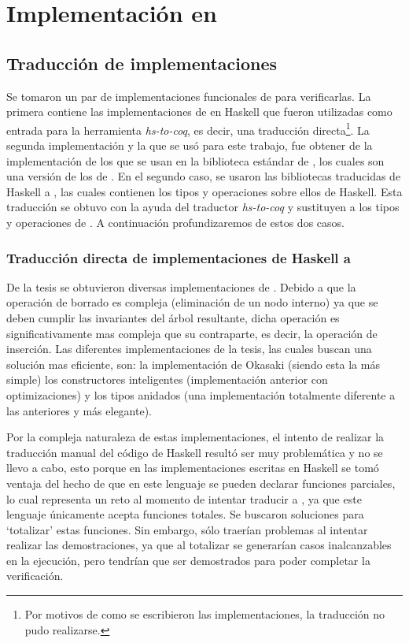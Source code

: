 \chapter{Implementación en {\coq}}

\section{Traducción de implementaciones}
Se tomaron un par de implementaciones funcionales de {\arns} para verificarlas. La primera contiene 
las implementaciones de \cite{tesisG} en Haskell que fueron utilizadas como entrada para la 
herramienta \textit{hs-to-coq}, es decir, una traducci\'on directa\footnote{Por motivos de como se  escribieron las implementaciones, la traducción no pudo realizarse.}. La segunda implementaci\'on y la 
que se us\'o para este trabajo, fue obtener de \cite{MSetRBT} la implementaci\'on de los {\arns} que 
se usan en la biblioteca estándar de {\coq}, los cuales son una versi\'on de los {\arns} de 
\cite{Okasaki}. En el segundo caso, se usaron las bibliotecas traducidas de Haskell a {\coq}, 
las cuales contienen los tipos y operaciones sobre ellos de Haskell. Esta traducción se obtuvo con 
la ayuda del traductor \textit{hs-to-coq} y sustituyen a los tipos y operaciones de {\coq}. A 
continuación profundizaremos de estos  dos casos.

\subsection{Traducción directa de implementaciones de Haskell a {\coq}}
De la tesis \cite{tesisG} se obtuvieron diversas implementaciones de {\arns}. Debido a que la 
operaci\'on de borrado es compleja (eliminaci\'on de un nodo interno) ya que se deben cumplir las 
invariantes del \'arbol resultante, dicha operación es significativamente mas compleja que su 
contraparte, es decir, la operación de inserci\'on. Las diferentes implementaciones de la 
tesis\cite{tesisG}, las cuales buscan una soluci\'on mas eficiente, son: la implementación de 
Okasaki (siendo esta la m\'as simple) los constructores inteligentes (implementaci\'on anterior con 
optimizaciones) y los tipos anidados (una implementaci\'on totalmente diferente a las anteriores y 
m\'as elegante).

Por la compleja naturaleza de estas implementaciones, el intento de realizar la traducción manual del código de Haskell 
result\'o ser muy problemática y no se llevo a cabo, esto porque en las implementaciones escritas en Haskell se tom\'o 
ventaja del hecho de que en este lenguaje se pueden declarar funciones parciales, lo cual representa
un reto al momento de intentar traducir a {\coq}, ya que este lenguaje únicamente 
acepta funciones totales. Se buscaron soluciones para `totalizar' estas funciones. Sin embargo,
s\'olo traerían problemas al intentar realizar las demostraciones, ya que al totalizar se generar\'ian 
casos inalcanzables en la ejecuci\'on, pero tendrían que ser demostrados para poder completar la 
verificaci\'on. 

